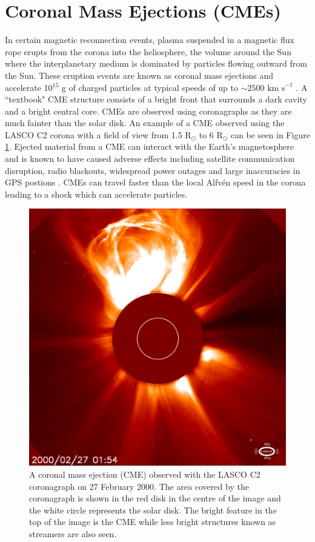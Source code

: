 \section{Coronal Mass Ejections (CMEs)}
\label{subsec:CMEs}
In certain magnetic reconnection events, plasma suspended in a magnetic flux rope erupts from the corona into the heliosphere, the volume around the Sun where the interplanetary medium is dominated by particles flowing outward from the Sun. These eruption events are known as coronal mass ejections and accelerate 10$^{15}$ g of charged particles at typical speeds of up to $\sim 2500 \mbox{ km s}^{-1}$ \citep{Gopalswamy2000}. A ``textbook" CME structure consists of a bright front that surrounds a dark cavity and a bright central core. CMEs are observed using coronagraphs as they are much fainter than the solar disk. An example of a CME observed using the LASCO C2 corona with a field of view from 1.5 R$_\odot$ to 6 R$_\odot$ can be seen in Figure \ref{fig:CME}. Ejected material from a CME can interact with the Earth's magnetosphere and is known to have caused adverse effects including satellite communication disruption, radio blackouts, widespread power outages and large inaccuracies in GPS postions \citep{Eastwood2017}. CMEs can travel faster than the local Alfv\'{e}n speed in the corona leading to a shock which can accelerate particles. 

\begin{figure}
    \centering
    \includegraphics[width=0.75\columnwidth]{Images/LASCO_C2_CME.jpg}
    \caption[CME observed with the LASCO C2 coronagraph on 27 February 2000.]{A coronal mass ejection (CME) observed with the LASCO C2 coronagraph on 27 February 2000. The area covered by the coronagraph is shown in the red disk in the centre of the image and the white circle represents the solar disk. The bright feature in the top of the image is the CME while less bright structures known as streamers are also seen.}
    \label{fig:CME}
\end{figure}

